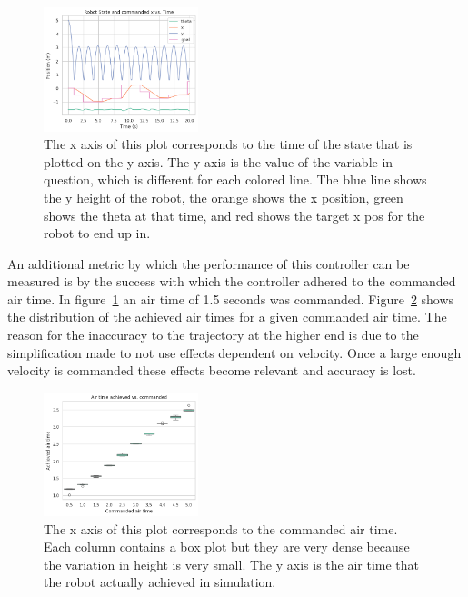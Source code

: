 \documentclass[conference]{IEEEtran}
\begin{document}
\begin{figure}[h!]
    \centering
    \includegraphics[width=0.4\textwidth]{fig2.png}
    \caption{
        The x axis of this plot corresponds to the time of the state that is plotted on the y axis.
        The y axis is the value of the variable in question, which is different for each colored line.
        The blue line shows the y height of the robot, the orange shows the x position, green shows the theta at that time, and red shows the target x pos for the robot to end up in.
    }
    \label{fig:fig2}
\end{figure}

An additional metric by which the performance of this controller can be measured is by the success with which the controller adhered to the commanded air time.
In figure~\ref{fig:fig2} an air time of 1.5 seconds was commanded.
Figure~\ref{fig:fig3} shows the distribution of the achieved air times for a given commanded air time.
The reason for the inaccuracy to the trajectory at the higher end is due to the simplification made to not use effects dependent on velocity.
Once a large enough velocity is commanded these effects become relevant and accuracy is lost.

\begin{figure}[h!]
    \centering
    \includegraphics[width=0.4\textwidth]{fig3.png}
    \caption{
        The x axis of this plot corresponds to the commanded air time.
        Each column contains a box plot but they are very dense because the variation in height is very small.
        The y axis is the air time that the robot actually achieved in simulation.
    }
    \label{fig:fig3}
\end{figure}
\end{document}
